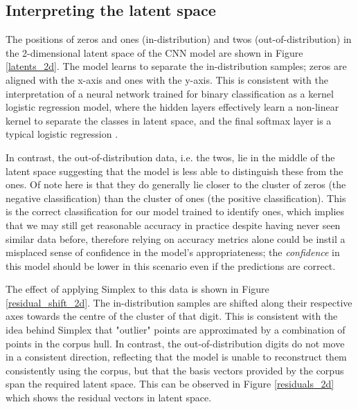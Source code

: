 \documentclass{article}
\begin{document}
\subsection{Interpreting the latent space}
\label{sec:interpret latent space}

The positions of zeros and ones (in-distribution) and twos (out-of-distribution) in the 2-dimensional latent space of the CNN model are shown in Figure \ref{latents_2d}. The model learns to separate the in-distribution samples; zeros are aligned with the x-axis and ones with the y-axis. This is consistent with the interpretation of a  neural network trained for binary classification as a kernel logistic regression model, where the hidden layers effectively learn a non-linear kernel to separate the classes in latent space, and the final softmax layer is a typical logistic regression \cite{pmlr-v202-guyomard23a}.

In contrast, the out-of-distribution data, i.e. the twos, lie in the middle of the latent space suggesting that the model is less able to distinguish these from the ones. Of note here is that they do generally lie closer to the cluster of zeros (the negative classification) than the cluster of ones (the positive classification). This is the correct classification for our model trained to identify ones, which implies that we may still get reasonable accuracy in practice despite having never seen similar data before, therefore relying on accuracy metrics alone could be instil a misplaced sense of confidence in the model's appropriateness; the \emph{confidence} in this model should be lower in this scenario even if the predictions are correct.

The effect of applying Simplex to this data is shown in Figure \ref{residual_shift_2d}. The in-distribution samples are shifted along their respective axes towards the centre of the cluster of that digit. This is consistent with the idea behind Simplex that "outlier" points are approximated by a combination of points in the corpus hull. In contrast, the out-of-distribution digits do not move in a consistent direction, reflecting that the model is unable to reconstruct them consistently using the corpus, but that the basis vectors provided by the corpus span the required latent space. This can be observed in Figure \ref{residuals_2d} which shows the residual vectors in latent space.
\end{document}
